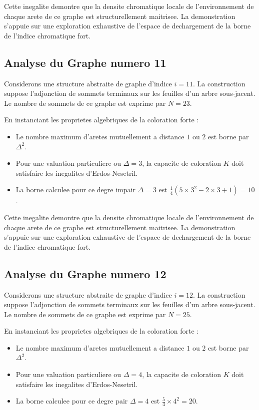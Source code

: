 \documentclass[11pt,a4paper]{article}
\begin{document}
Cette inegalite demontre que la densite chromatique locale de l'environnement de chaque arete de ce graphe est structurellement maitrisee. La demonstration s'appuie sur une exploration exhaustive de l'espace de dechargement de la borne de l'indice chromatique fort.

\subsection{Analyse du Graphe numero 11}
Considerons une structure abstraite de graphe d'indice $i = 11$. La construction suppose l'adjonction de sommets terminaux sur les feuilles d'un arbre sous-jacent. Le nombre de sommets de ce graphe est exprime par $N = 23$.

En instanciant les proprietes algebriques de la coloration forte :
\begin{itemize}
\item Le nombre maximum d'aretes mutuellement a distance $1$ ou $2$ est borne par $\Delta^2$.
\item Pour une valuation particuliere ou $\Delta = 3$, la capacite de coloration $K$ doit satisfaire les inegalites d'Erdos-Nesetril.
\item La borne calculee pour ce degre impair $\Delta = 3$ est $\frac{1}{4}(5 \times 3^2 - 2 \times 3 + 1) = 10$.
\end{itemize}

Cette inegalite demontre que la densite chromatique locale de l'environnement de chaque arete de ce graphe est structurellement maitrisee. La demonstration s'appuie sur une exploration exhaustive de l'espace de dechargement de la borne de l'indice chromatique fort.

\subsection{Analyse du Graphe numero 12}
Considerons une structure abstraite de graphe d'indice $i = 12$. La construction suppose l'adjonction de sommets terminaux sur les feuilles d'un arbre sous-jacent. Le nombre de sommets de ce graphe est exprime par $N = 25$.

En instanciant les proprietes algebriques de la coloration forte :
\begin{itemize}
\item Le nombre maximum d'aretes mutuellement a distance $1$ ou $2$ est borne par $\Delta^2$.
\item Pour une valuation particuliere ou $\Delta = 4$, la capacite de coloration $K$ doit satisfaire les inegalites d'Erdos-Nesetril.
\item La borne calculee pour ce degre pair $\Delta = 4$ est $\frac{5}{4} \times 4^2 = 20$.
\end{itemize}
\end{document}
